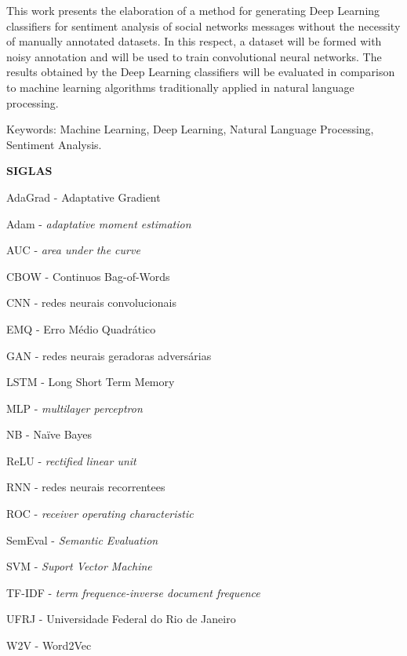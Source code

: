 This work presents the elaboration of a method for generating Deep Learning classifiers for sentiment analysis of social
networks messages without the necessity of manually annotated datasets.
In this respect, a dataset will be formed with noisy annotation and will be used to train convolutional neural networks.
The results obtained by the Deep Learning classifiers will be evaluated in comparison to machine learning algorithms
traditionally applied in natural language processing.

\vspace{1.0cm}

\noindent Keywords: Machine Learning, Deep Learning, Natural Language Processing, Sentiment Analysis.

\pagebreak

\begin{center}
\textbf{SIGLAS}
\end{center}
\vspace{0.5cm}

AdaGrad - Adaptative Gradient

Adam - \textit{adaptative moment estimation}

AUC - \textit{area under the curve}

CBOW - Continuos Bag-of-Words

CNN - redes neurais convolucionais

EMQ - Erro Médio Quadrático

GAN - redes neurais geradoras adversárias

LSTM - Long Short Term Memory

MLP - \textit{multilayer perceptron}

NB - Naïve Bayes

ReLU - \textit{rectified linear unit}

RNN - redes neurais recorrentees

ROC - \textit{receiver operating characteristic}

SemEval - \textit{Semantic Evaluation}

SVM - \textit{Suport Vector Machine}

TF-IDF - \textit{term frequence-inverse document frequence}

UFRJ - Universidade Federal do Rio de Janeiro

W2V - Word2Vec

\pagebreak
